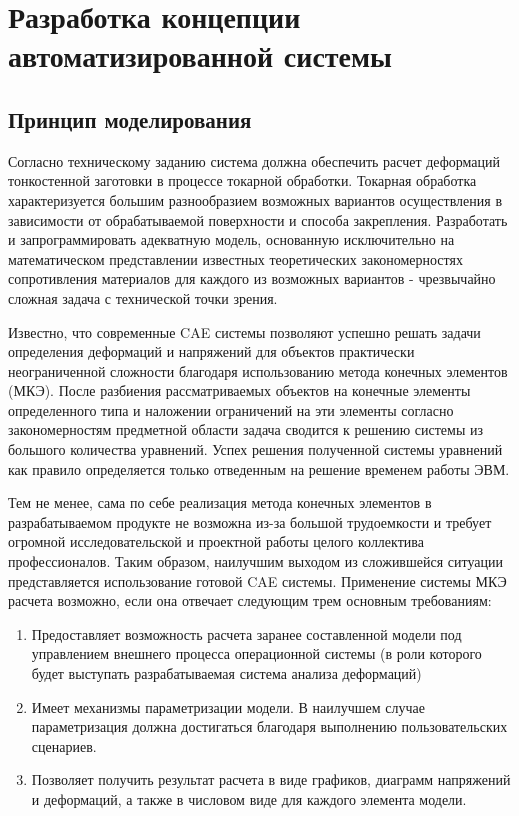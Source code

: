 \documentclass[14pt,oneside,final]{extreport}
\begin{document}
	\chapter{Разработка концепции автоматизированной системы}
	\section{Принцип моделирования}
	Согласно техническому заданию система должна обеспечить расчет деформаций тонкостенной заготовки в процессе токарной обработки. Токарная обработка характеризуется большим разнообразием возможных вариантов осуществления в зависимости от обрабатываемой поверхности и способа закрепления. Разработать и запрограммировать адекватную модель, основанную исключительно на математическом представлении известных теоретических закономерностях сопротивления материалов для каждого из возможных вариантов - чрезвычайно сложная задача с технической точки зрения. 
	
	Известно, что современные CAE системы позволяют успешно решать задачи определения деформаций и напряжений для объектов практически неограниченной сложности благодаря использованию метода конечных элементов (МКЭ). После разбиения рассматриваемых объектов на конечные элементы определенного типа и наложении ограничений на эти элементы согласно закономерностям предметной области задача сводится к решению системы из большого количества уравнений. Успех решения полученной системы уравнений как правило определяется только отведенным на решение временем работы ЭВМ. 
	
	Тем не менее, сама по себе реализация метода конечных элементов в разрабатываемом продукте не возможна из-за большой трудоемкости и требует огромной исследовательской и проектной работы целого коллектива профессионалов. Таким образом, наилучшим выходом из сложившейся ситуации представляется использование готовой CAE системы. Применение системы МКЭ расчета возможно, если она отвечает следующим трем основным требованиям:
	\begin{enumerate}
	\item Предоставляет возможность расчета заранее составленной модели под управлением внешнего процесса операционной системы (в роли которого будет выступать разрабатываемая система анализа деформаций)
	\item Имеет механизмы параметризации модели. В наилучшем случае параметризация должна достигаться благодаря выполнению пользовательских сценариев.
	\item Позволяет получить результат расчета в виде графиков, диаграмм напряжений и деформаций, а также в числовом виде для каждого элемента модели.
	\end{enumerate}
		
\end{document}

